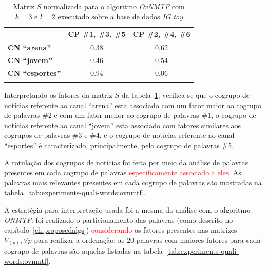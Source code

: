 \documentclass[
    12pt,                %
    oneside,            %
    a4paper,            %
    english,            %
    brazil                %
    ]{abntex2ppgsi}
\begin{document}
\begin{table}[H]
\centering
    \caption{Matriz $S$ normalizada para o algoritmo \textit{OvNMTF} com $k = 3$ e $l = 2$ executado sobre a base de dados \textit{IG toy}}
    \begin{tabular}{lcc}
        \hline
        & \textbf{CP \#1, \#3, \#5} & \textbf{CP \#2, \#4, \#6} \\
        \hline
        \textbf{CN ``arena''}    & $\mathbf{0.38}$ & $\mathbf{0.62}$ \\
        \textbf{CN ``jovem''}    & $\mathbf{0.46}$ & $\mathbf{0.54}$ \\
        \textbf{CN ``esportes''} & $\mathbf{0.94}$ & $0.06$ \\
        \hline \\
    \end{tabular}
    \label{tab:ovnmtf:matrizS}
\end{table}

Interpretando os fatores da matriz $S$ da tabela~\ref{tab:ovnmtf:matrizS}, verifica-se que o cogrupo de notícias referente ao canal ``arena'' esta associado com um fator maior ao cogrupo de palavras \#2 e com um fator menor ao cogrupo de palavras \#1, o cogrupo de notícias referente ao canal ``jovem'' esta associado com fatores similares aos cogrupos de palavras \#3 e \#4, e o cogrupo de notícias referente ao canal ``esportes'' é caracterizado, principalmente, pelo cogrupo de palavras \#5.

A rotulação dos cogrupos de notícias foi feita por meio da análise de palavras presentes em cada cogrupo de palavras \textcolor{red}{especificamente associado a eles}. As palavras mais relevantes presentes em cada cogrupo de palavras são mostradas na tabela~\ref{tab:experiments-quali-words:ovnmtf}.

A estratégia para interpretação usada foi a mesma da análise com o algoritmo \textit{ONMTF}: foi realizado o particionamento das palavras (como descrito no capítulo~\ref{ch:proposedalgs}) \textcolor{red}{considerando} os fatores presentes nas matrizes $V_{(p)}, \forall p$ para realizar a ordenação; as $20$ palavras com maiores fatores para cada cogrupo de palavras são aquelas listadas na tabela~\ref{tab:experiments-quali-words:ovnmtf}.

\end{document}
